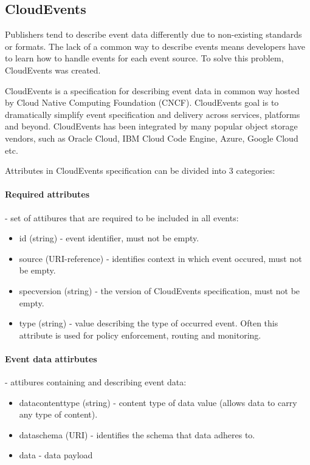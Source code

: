     \subsection{CloudEvents}
    Publishers tend to describe event data differently due to non-existing standards or formats. The lack of a common way to describe events means developers have to learn how to handle events for each event source. To solve this problem, CloudEvents was created.

    CloudEvents is a specification for describing event data in common way\cite{eventCloudEvents} hosted by Cloud Native Computing Foundation (CNCF)\cite{eventCNCF}. CloudEvents goal is to dramatically simplify event specification and delivery across services, platforms and beyond.
    CloudEvents has been integrated by many popular object storage vendors, such as Oracle Cloud, IBM Cloud Code Engine, Azure, Google Cloud etc.

    Attributes in CloudEvents specification can be divided into 3 categories:
    \paragraph{Required attributes} - set of attibures that are required to be included in all events\cite{eventCloudEventsSpec}:
    \begin{itemize}
        \item id (string) - event identifier, must not be empty.
        \item source (URI-reference) - identifies context in which event occured, must not be empty.
        \item specversion (string) - the version of CloudEvents specification, must not be empty.
        \item type (string) - value describing the type of occurred event. Often this attribute is used for policy enforcement, routing and monitoring.
    \end{itemize}

    \paragraph{Event data attirbutes} - attibures containing and describing event data:
    \begin{itemize}
        \item datacontenttype (string) - content type of data value (allows data to carry any type of content).
        \item dataschema (URI) - identifies the schema that data adheres to.
        \item data - data payload
    \end{itemize}


